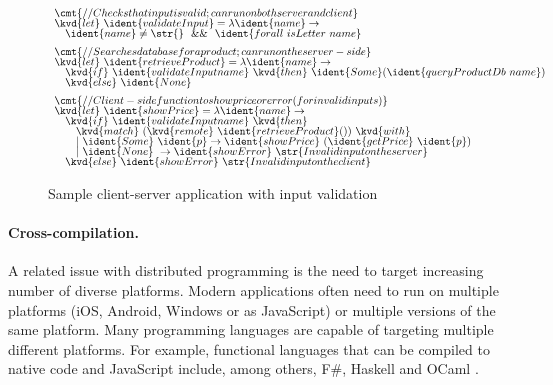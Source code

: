 \begin{figure}
\begin{equation*}
\begin{array}{l}
\cmt{// Checks that input is valid; can run on both server and client}\\[-0.25em]
\kvd{let}~\ident{validateInput} = \lambda \ident{name} \rightarrow\\[-0.25em]
\quad\ident{name} \neq \str{} ~~\&\&~~ \ident{forall~isLetter~name}
\\[0.5em]
\cmt{// Searches database for a product; can run on the server-side}\\[-0.25em]
\kvd{let}~\ident{retrieveProduct} = \lambda \ident{name} \rightarrow\\[-0.25em]
\quad\kvd{if}~\ident{validateInput name}~\kvd{then}~\ident{Some}(\ident{queryProductDb~name})\\[-0.25em]
\quad\kvd{else}~\ident{None}
\\[0.5em]
\cmt{// Client-side function to show price or error (for invalid inputs)}\\[-0.25em]
\kvd{let}~\ident{showPrice} = \lambda \ident{name} \rightarrow\\[-0.25em]
\quad\kvd{if}~\ident{validateInput name}~\kvd{then}\\[-0.25em]
\quad\quad\kvd{match}~(\kvd{remote}~\ident{retrieveProduct}())~\kvd{with}\\[-0.25em]
\quad\quad|~\ident{Some}~\ident{p} \rightarrow \ident{showPrice}~(\ident{getPrice}~\ident{p})\\[-0.25em]
\quad\quad|~\ident{None}~\rightarrow \ident{showError}~\str{Invalid input on the server}\\[-0.25em]
\quad\kvd{else}~\ident{showError}~\str{Invalid input on the client}
\end{array}
\end{equation*}

\vspace{1em}
\noindent\makebox[\linewidth]{\rule{\textwidth}{0.5pt}} 
\vspace{-1.5em}
\caption{Sample client-server application with input validation}
\label{fig:applications-flat-distr}
\end{figure}


\paragraph{Cross-compilation.}
A related issue with distributed programming is the need to target increasing number of diverse
platforms. Modern applications often need to run on multiple platforms (iOS, Android, Windows or
as JavaScript) or multiple versions of the same platform. Many programming languages are capable
of targeting multiple different platforms. For example, functional languages that can be compiled 
to native code and JavaScript include, among others, F\#, Haskell and OCaml \cite{app-ocaml-js}.

